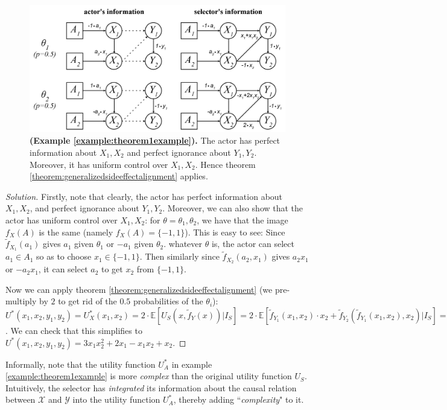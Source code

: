 \begin{figure}[H]
	\centering
	\captionsetup{labelfont=bf,font=small,labelsep=period}
	\includegraphics[width=0.7\linewidth]{"images/theorem-examples/theorem1example"}
	\caption{\rightskip=20pt\leftskip=20pt \textbf{(Example \ref{example:theorem1example}).} The actor has perfect information about $X_1,X_2$ and perfect ignorance about $Y_1,Y_2$. Moreover, it has uniform control over $X_1,X_2$. Hence theorem \ref{theorem:generalizedsideeffectalignment} applies. }
	\label{fig:theorem1example} 	
\end{figure}
\begin{proof}[Solution]
	Firstly, note that clearly, the actor has perfect information about $X_1,X_2$, and perfect ignorance about $Y_1,Y_2$. Moreover, we can also show that the actor has uniform control over $X_1,X_2$: for $\theta=\theta_1,\theta_2$, we have that the image $f_X(A)$ is the same (namely $f_X(A)=\{-1,1\}$). This is easy to see: Since $\tilde f_{X_1}(a_1)$ gives $a_1$ given $\theta_1$ or $-a_1$ given $\theta_2$. whatever $\theta$ is, the actor can select $a_1\in A_1$ so as to choose $x_1\in \{-1,1\}$. Then similarly since $\tilde f_{X_2}(a_2,x_1)$ gives $a_2x_1$ or $-a_2x_1$, it can select $a_2$ to get $x_2$ from $\{-1,1\}$.
	
	Now we can apply theorem \ref{theorem:generalizedsideeffectalignment} (we pre-multiply by $2$ to get rid of the $0.5$ probabilities of the $\theta_i$): $U^*(x_1,x_2,y_1,y_2)=U^*_X(x_1,x_2)=2\cdot\mathbb E[U_S(x,\tilde f_Y(x))|I_S]=2\cdot\mathbb E[\tilde f_{Y_1}(x_1,x_2)\cdot x_2+
	\tilde f_{Y_2}(\tilde f_{Y_1}(x_1,x_2),x_2)|I_S] =[(x_1+x_1x_2)x_2+(x_1+x_1x_2)-x_2]+[(-x_1+2x_1x_2)x_2-(-x_1+2x_1x_2)+2x_2]$. We can check that this simplifies to $U^*(x_1,x_2,y_1,y_2)=3x_1x_2^2+2x_1-x_1x_2+x_2$.
\end{proof}


\begin{remark*}
	\textnormal{Informally, note that the utility function $U^*_A$ in example \ref{example:theorem1example} is more \textit{complex} than the original utility function $U_S$. Intuitively, the selector has \textit{integrated} its information about the causal relation between $\mathcal X$ and $\mathcal Y$ into the utility function $U_A^*$, thereby adding ``\textit{complexity}" to it.}
\end{remark*}
	
